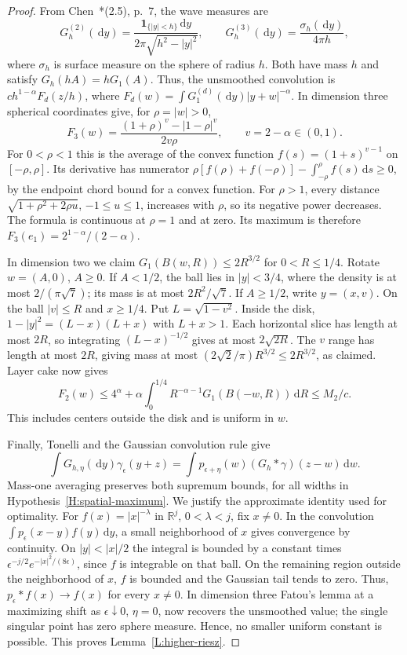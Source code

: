 \documentclass[12pt]{article}
\numberwithin{equation}{section}
\theoremstyle{definition}
\newcommand{\R}{\mathbb{R}}
\newcommand{\ud}{\,\mathrm{d}}
\begin{document}
\begin{proof}
  From Chen~\cite{chen:author2026:time-dependency}*{(2.5), p.~7},
  the wave measures are
  \[
    G_h^{(2)}(\ud y)=\frac{\mathbf1_{\{|y|<h\}}\ud y}
    {2\pi\sqrt{h^2-|y|^2}},\qquad
    G_h^{(3)}(\ud y)=\frac{\sigma_h(\ud y)}{4\pi h},
  \]
  where $\sigma_h$ is surface measure on the sphere of radius $h$.
  Both have mass $h$ and satisfy $G_h(hA)=hG_1(A)$. Thus, the
  unsmoothed convolution is $ch^{1-\alpha}F_d(z/h)$, where
  $F_d(w)=\int G_1^{(d)}(\ud y)|y+w|^{-\alpha}$.
  In dimension three spherical coordinates give, for $\rho=|w|>0$,
  \[
    F_3(w)=\frac{(1+\rho)^v-|1-\rho|^v}{2v\rho},
    \qquad v=2-\alpha\in(0,1).
  \]
  For $0<\rho<1$ this is the average of the convex function
  $f(s)=(1+s)^{v-1}$ on $[-\rho,\rho]$. Its derivative has numerator
  $\rho[f(\rho)+f(-\rho)]-\int_{-\rho}^\rho f(s)\ud s\ge0$,
  by the endpoint chord bound for a convex function. For $\rho>1$,
  every distance $\sqrt{1+\rho^2+2\rho u}$, $-1\le u\le1$,
  increases with $\rho$, so its negative power decreases.
  The formula is continuous at $\rho=1$ and at zero. Its maximum
  is therefore $F_3(e_1)=2^{1-\alpha}/(2-\alpha)$.

  In dimension two we claim $G_1(B(w,R))\le2R^{3/2}$ for
  $0<R\le1/4$. Rotate $w=(A,0)$, $A\ge0$. If $A<1/2$, the ball
  lies in $|y|<3/4$, where the density is at most $2/(\pi\sqrt7)$;
  its mass is at most $2R^2/\sqrt7$. If $A\ge1/2$, write $y=(x,v)$.
  On the ball $|v|\le R$ and $x\ge1/4$. Put $L=\sqrt{1-v^2}$.
  Inside the disk, $1-|y|^2=(L-x)(L+x)$ with $L+x>1$.
  Each horizontal slice has length at most $2R$, so integrating
  $(L-x)^{-1/2}$ gives at most $2\sqrt{2R}$. The $v$ range has
  length at most $2R$, giving mass at most
  $(2\sqrt2/\pi)R^{3/2}\le2R^{3/2}$, as claimed. Layer cake now gives
  \[
    F_2(w)\le4^\alpha+
    \alpha\int_0^{1/4}R^{-\alpha-1}G_1(B(-w,R))\ud R
    \le M_2/c.
  \]
  This includes centers outside the disk and is uniform in $w$.

  Finally, Tonelli and the Gaussian convolution rule give
  \[
    \int G_{h,\eta}(\ud y)\gamma_\epsilon(y+z)
    =\int p_{\epsilon+\eta}(w)(G_h*\gamma)(z-w)\ud w.
  \]
  Mass-one averaging preserves both supremum bounds, for all widths
  in Hypothesis~\ref{H:spatial-maximum}. We justify the approximate
  identity used for optimality. For $f(x)=|x|^{-\lambda}$ in
  $\R^j$, $0<\lambda<j$, fix $x\ne0$. In the convolution
  $\int p_\epsilon(x-y)f(y)\ud y$, a small neighborhood of $x$
  gives convergence by continuity. On $|y|<|x|/2$ the integral is
  bounded by a constant times
  $\epsilon^{-j/2}e^{-|x|^2/(8\epsilon)}$, since $f$ is integrable
  on that ball. On the remaining region outside the neighborhood of
  $x$, $f$ is bounded and the Gaussian tail tends to zero.
  Thus, $p_\epsilon*f(x)\to f(x)$ for every $x\ne0$.
  In dimension three Fatou's lemma at a maximizing shift as
  $\epsilon\downarrow0$, $\eta=0$, now recovers the unsmoothed
  value; the single singular point has zero sphere measure.
  Hence, no smaller uniform constant is possible. This proves
  Lemma~\ref{L:higher-riesz}.
\end{proof}
\end{document}
